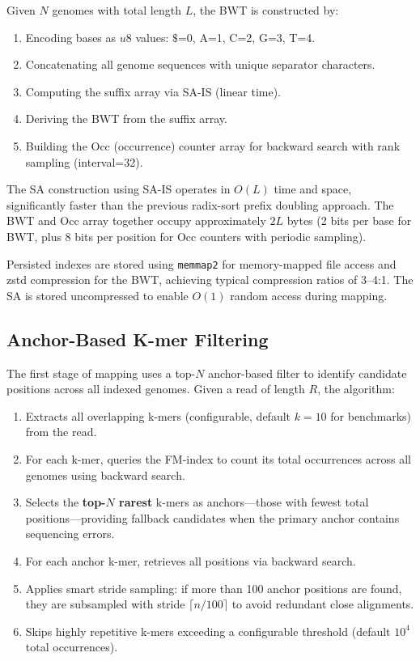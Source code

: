 \documentclass{article}
\begin{document}
Given $N$ genomes with total length $L$, the BWT is constructed by:
\begin{enumerate}
    \item Encoding bases as $u8$ values: $\$$=0, A=1, C=2, G=3, T=4.
    \item Concatenating all genome sequences with unique separator characters.
    \item Computing the suffix array via SA-IS (linear time).
    \item Deriving the BWT from the suffix array.
    \item Building the Occ (occurrence) counter array for backward search with rank sampling (interval=32).
\end{enumerate}

The SA construction using SA-IS operates in $O(L)$ time and space, significantly faster than the previous radix-sort prefix doubling approach. The BWT and Occ array together occupy approximately $2L$ bytes (2 bits per base for BWT, plus 8 bits per position for Occ counters with periodic sampling).

Persisted indexes are stored using \texttt{memmap2} for memory-mapped file access and zstd compression for the BWT, achieving typical compression ratios of 3--4:1. The SA is stored uncompressed to enable $O(1)$ random access during mapping.

\subsection{Anchor-Based K-mer Filtering}

The first stage of mapping uses a top-$N$ anchor-based filter to identify candidate positions across all indexed genomes. Given a read of length $R$, the algorithm:

\begin{enumerate}
    \item Extracts all overlapping k-mers (configurable, default $k=10$ for benchmarks) from the read.
    \item For each k-mer, queries the FM-index to count its total occurrences across all genomes using backward search.
    \item Selects the \textbf{top-$N$ rarest} k-mers as anchors---those with fewest total positions---providing fallback candidates when the primary anchor contains sequencing errors.
    \item For each anchor k-mer, retrieves all positions via backward search.
    \item Applies smart stride sampling: if more than 100 anchor positions are found, they are subsampled with stride $\lceil n/100 \rceil$ to avoid redundant close alignments.
    \item Skips highly repetitive k-mers exceeding a configurable threshold (default $10^4$ total occurrences).
\end{enumerate}
\end{document}
